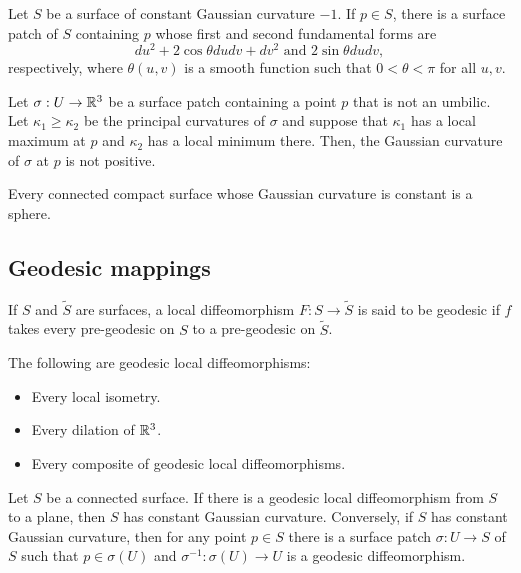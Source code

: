 \begin{proposition}
  Let $S$ be a surface of constant Gaussian curvature $-1$.
  If $p \in S$, there is a surface patch of $S$ containing $p$ whose
  first and second fundamental forms are
  \[
    du^2 + 2 \cos \theta du dv + dv^2 \text{ and } 2 \sin \theta du dv,  
  \]
  respectively, where $\theta(u, v)$ is a smooth function such that
  $0 < \theta < \pi$ for all $u, v$.
\end{proposition}

\begin{lemma}
  Let $\sigma: U \to \mathbb{R}^3$ be a surface patch containing a point $p$ that is not an umbilic.
  Let $\kappa_1 \geq \kappa_2$ be the principal curvatures of $\sigma$ and suppose that $\kappa_1$
  has a local maximum at $p$ and $\kappa_2$ has a local minimum there.
  Then, the Gaussian curvature of $\sigma$ at $p$ is not positive.
\end{lemma}

\begin{theorem}
  Every connected compact surface whose Gaussian curvature is constant is a sphere.
\end{theorem}

\subsection{Geodesic mappings}

\begin{defn}
  If $S$ and $\tilde S$ are surfaces, a local diffeomorphism $F: S \to \tilde S$
  is said to be geodesic if $f$ takes every pre-geodesic on $S$ to a pre-geodesic on $\tilde S$.
\end{defn}

\begin{proposition}
  The following are geodesic local diffeomorphisms:
  \begin{itemize}
    \item Every local isometry.
    \item Every dilation of $\mathbb{R}^3$.
    \item Every composite of geodesic local diffeomorphisms.
  \end{itemize}
\end{proposition}

\begin{theorem}
  Let $S$ be a connected surface.
  If there is a geodesic local diffeomorphism from $S$ to a plane,
  then $S$ has constant Gaussian curvature.
  Conversely, if $S$ has constant Gaussian curvature, then for any point
  $p \in S$ there is a surface patch $\sigma: U \to S$ of $S$ such that
  $p \in \sigma(U)$ and $\sigma^{-1}: \sigma(U) \to U$ is a geodesic diffeomorphism.
\end{theorem}
